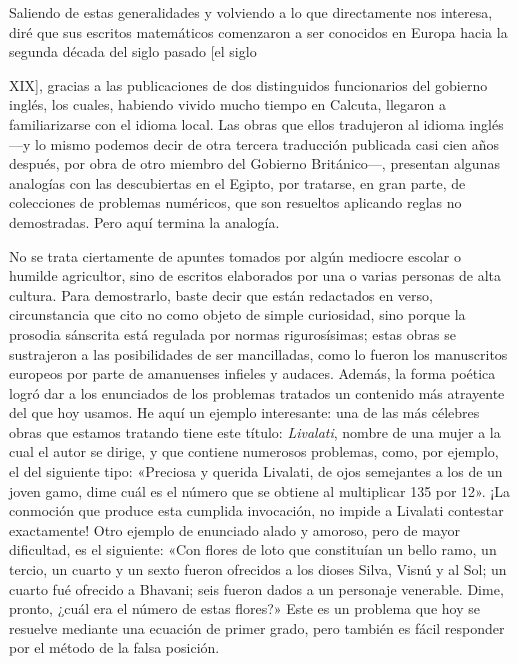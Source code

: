 \documentclass[a4paper, 12pt, draft]{article}
\begin{document}
Saliendo de estas generalidades y volviendo a lo que directamente nos interesa, diré que sus escritos matemáticos comenzaron a ser conocidos en Europa hacia la segunda década del siglo pasado [el siglo {XIX], gracias a las publicaciones de dos distinguidos funcionarios del gobierno inglés, los cuales, habiendo vivido mucho tiempo en Calcuta, llegaron a familiarizarse con el idioma local. Las obras que ellos tradujeron al idioma inglés ---y lo mismo podemos decir de otra tercera traducción publicada casi cien años después, por obra de otro miembro del Gobierno Británico---, presentan algunas analogías con las descubiertas en el Egipto, por tratarse, en gran parte, de colecciones de problemas numéricos, que son resueltos aplicando reglas no demostradas. Pero aquí termina la analogía.



No se trata ciertamente de apuntes tomados por algún mediocre escolar o humilde agricultor, sino de escritos elaborados por una o varias personas de alta cultura. Para demostrarlo, baste decir que están redactados en verso, circunstancia que cito no como objeto de simple curiosidad, sino porque la prosodia sánscrita está regulada por normas rigurosísimas; estas obras se sustrajeron a las posibilidades de ser mancilladas, como lo fueron los manuscritos europeos por parte de amanuenses infieles y audaces. Además, la forma poética logró dar a los enunciados de los problemas tratados un
contenido más atrayente del que hoy usamos. He
aquí un ejemplo interesante: una de las más célebres obras que estamos tratando tiene este título:
\textit{ Livalati}, nombre de una mujer a la cual el autor
se dirige, y que contiene numerosos problemas, como, por ejemplo,
el del siguiente tipo: «Preciosa 
y querida Livalati, de ojos semejantes a los de un joven gamo, dime cuál es el número que se obtiene al multiplicar 135 por 12». ¡La conmoción que produce esta cumplida invocación, no impide a Livalati contestar exactamente! Otro ejemplo de enunciado alado y amoroso, pero de mayor dificultad, es el siguiente: «Con flores de loto que constituían un bello ramo, un tercio, un cuarto y un sexto fueron ofrecidos a los dioses Silva, Visnú y al Sol; un cuarto fué ofrecido a Bhavani; seis fueron dados a un personaje venerable. Dime, pronto, ¿cuál era el número de estas flores?» Este es un problema que hoy se resuelve mediante una ecuación de primer grado, pero también es fácil responder por el método de la falsa posición.

}
\end{document}

